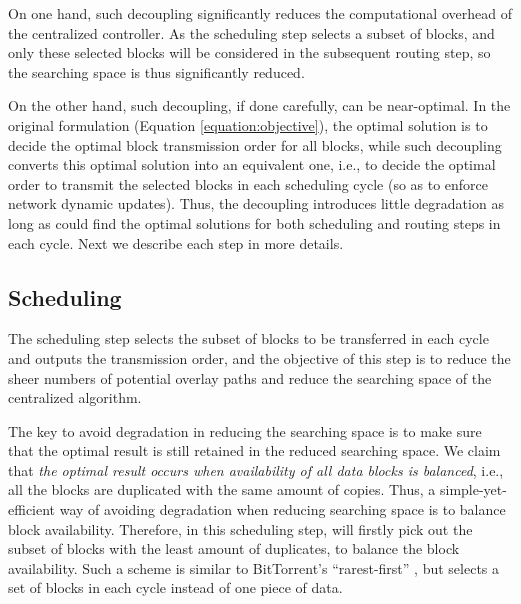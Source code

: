 On one hand, such decoupling significantly reduces the computational overhead of the centralized controller. As the scheduling step selects a subset of blocks, and only these selected blocks will be considered in the subsequent routing step, so the searching space is thus significantly reduced.



On the other hand, such decoupling, if done carefully, can be near-optimal. In the original formulation (Equation \ref{equation:objective}), the optimal solution is to decide the optimal block transmission order for all blocks, while such decoupling converts this optimal solution into an equivalent one, i.e., to decide the optimal order to transmit the selected blocks in each scheduling cycle (so as to enforce network dynamic updates). Thus, the decoupling introduces little degradation as long as \name could find the optimal solutions for both scheduling and routing steps in each cycle. Next we describe each step in more details.


\subsection{Scheduling}
\label{subsec:logic:scheduling}

The scheduling step
selects the subset of blocks to be transferred in each cycle and
outputs the transmission order, and the objective of this step is to reduce the sheer numbers of potential overlay paths and reduce the searching space of the centralized algorithm.


The key to avoid degradation in reducing the searching space is to make sure that the optimal result is still retained in the reduced searching space. We claim that {\em the optimal result occurs when availability of all data blocks is balanced}, i.e., all the blocks are duplicated with the same amount of copies. Thus, a simple-yet-efficient way of avoiding degradation when reducing searching space is to balance block availability. Therefore, in this scheduling step, \name will firstly pick out the subset of blocks with the least amount of duplicates, to balance the block availability. Such a scheme is similar to BitTorrent's ``rarest-first'' \cite{Cohen2003Incentives}, but \name selects a set of blocks in each cycle instead of one piece of data.


